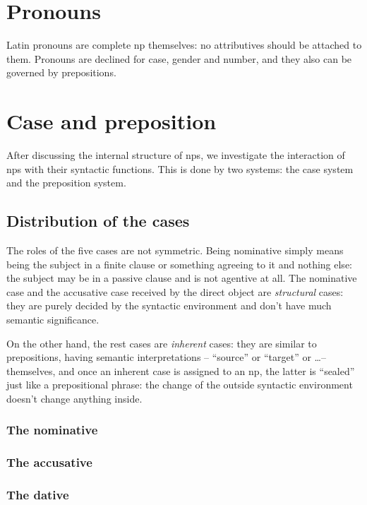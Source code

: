 \documentclass[a4paper, oneside]{report}
\begin{document}
\section{Pronouns}

Latin pronouns are complete \acs{np} themselves:
no attributives should be attached to them. 
Pronouns are declined for case, gender and number,
and they also can be governed by prepositions.

\section{Case and preposition}

After discussing the internal structure of \acs{np}s, 
we investigate the interaction of \acs{np}s 
with their syntactic functions.
This is done by two systems: 
the case system and the preposition system.


\subsection{Distribution of the cases}\label{sec:np.case-distribution}

The roles of the five cases are not symmetric.
Being nominative simply means being the subject in a finite clause or something agreeing to it 
and nothing else: 
the subject may be in a passive clause and is not agentive at all.
The nominative case and the accusative case received by the direct object 
are \emph{structural} cases: 
they are purely decided by the syntactic environment 
and don't have much semantic significance.

On the other hand, the rest cases are \emph{inherent} cases:
they are similar to prepositions, having semantic interpretations
-- ``source'' or ``target'' or \dots -- themselves,
and once an inherent case is assigned to an \acs{np},
the latter is ``sealed'' just like a prepositional phrase:
the change of the outside syntactic environment 
doesn't change anything inside.

\subsubsection{The nominative}

\subsubsection{The accusative}\label{sec:accusative-distribution}

\subsubsection{The dative}
\end{document}
